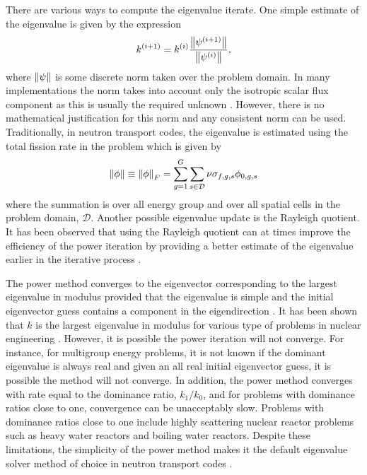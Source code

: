 There are various ways to compute the eigenvalue iterate. One simple estimate of the eigenvalue is given by the expression
\begin{equation}
k^{(i+1)} = k^{(i)} \frac{ \left\lVert\psi^{(i+1)}\right\rVert}{\left\lVert\psi^{(i)}\right\rVert},
\end{equation}
where $\left\lVert\psi\right\rVert$ is some discrete norm taken over the problem domain. In many implementations the norm takes into account only the isotropic scalar flux component as this is usually the required unknown \cite{warsa_krylov_2004}. However, there is no mathematical justification for this norm and any consistent norm can be used. Traditionally, in neutron transport codes, the eigenvalue is estimated using the total fission rate in the problem \cite{warsa_krylov_2004} which is given by 
\begin{equation}
	\left\lVert\phi\right\rVert \equiv \left\lVert\phi\right\rVert_{F} = \sum_{g=1}^{G} \sum_{s \in \mathcal{D}} \nu \sigma_{f,g,s} \phi_{0,g,s}
\end{equation}
where the summation is over all energy group and over all spatial cells in the problem domain, $\mathcal{D}$. Another possible eigenvalue update is the Rayleigh quotient. It has been observed that using the Rayleigh quotient can at times improve the efficiency of the power iteration by providing a better estimate of the eigenvalue earlier in the iterative process \cite{warsa_krylov_2004}.

The power method converges to the eigenvector corresponding to the largest eigenvalue in modulus provided that the eigenvalue is simple and the initial eigenvector guess contains a component in the eigendirection \cite{golub_matrix_2012}. It has been shown that $k$ is the largest eigenvalue in modulus for various type of problems in nuclear engineering \cite{modak_evaluation_1995}. However, it is possible the power iteration will not converge. For instance, for multigroup energy problems, it is not known if the dominant eigenvalue is always real and given an all real initial eigenvector guess, it is possible the method will not converge. In addition, the power method converges with rate equal to the dominance ratio, $k_{1}/k_{0}$, and for problems with dominance ratios close to one, convergence can be unacceptably slow. Problems with dominance ratios close to one include highly scattering nuclear reactor problems such as heavy water reactors and boiling water reactors. Despite these limitations, the simplicity of the power method makes it the default eigenvalue solver method of choice in neutron transport codes \cite{duderstadt_nuclear_1976}.

